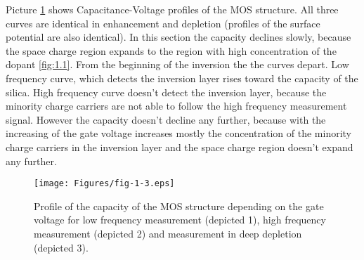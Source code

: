 \iffalse
\par Na obrázku \ref{fig:1.3} sú znázornené kapacitne-napäťové
závislosti štruktúry MOS. Všetky tri krivky majú spoločný priebeh v
oblasti obohatenia a ochudobnenia (spoločný priebeh majú aj krivky
povrchového potenciálu). V tejto časti klesá kapacita pomaly, pretože
oblasť priestorového náboja sa rozpína cez oblasť s vysokou
koncentráciou prímesí (obr.1.1). Od počiatku inverzie sa krivky
rozdeľujú. Nízkofrekvenčná krivka, ktorá zaznamenáva inverznú vrstvu,
stúpa až ku kapacite oxidu. Vysokofrekvenčná krivka nezaznamenáva
inverznú vrstvu, pretože minoritné nosiče nestačia sledovať
vysokofrekvenčný merací signál, avšak kapacita už ďalej neklesá,
pretože so zvyšovaním napätia hradla sa zvyšuje prevážne koncentrácia
minoritných nosičov v inverznej vrstve a oblasť priestorového náboja
sa ďalej nerozpína.
\fi
\par Picture \ref{fig:1.3} shows Capacitance-Voltage profiles of the
MOS structure. All three curves are identical in enhancement and
depletion (profiles of the surface potential are also identical). In
this section the capacity declines slowly, because the space charge
region expands to the region with high concentration of the dopant
\ref{fig:1.1}. From the beginning of the inversion the the curves
depart. Low frequency curve, which detects the inversion layer rises
toward the capacity of the silica. High frequency curve doesn't detect
the inversion layer, because the minority charge carriers are not able
to follow the high frequency measurement signal. However the capacity
doesn't decline any further, because with the increasing of the gate
voltage increases mostly the concentration of the minority charge
carriers in the inversion layer and the space charge region doesn't
expand any further.

\begin{figure}[h!]\centering
\texttt{[image: Figures/fig-1-3.eps]}
\captionsetup{justification=raggedright, singlelinecheck=false}
\iffalse
\caption[Priebeh kapacity štruktúry MOS v závislosti od napätia
  hradla]{Priebeh kapacity štruktúry MOS v závislosti od napätia
  hradla pre nízkofrekvenčné meranie (označené 1), vysokofrekvenčné
  meranie (označené 2) a meranie v stave hlbokého ochudobnenia
  (označené 3).}
\fi
\caption[Profile of the capacity of the MOS structure depending on the
  gate voltage]{Profile of the capacity of the MOS structure depending
  on the gate voltage for low frequency measurement (depicted 1), high
  frequency measurement (depicted 2) and measurement in deep depletion
  (depicted 3).}
\label{fig:1.3}
\end{figure}

